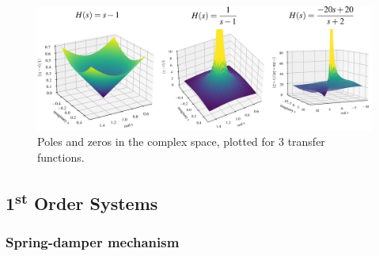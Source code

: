 \documentclass[12pt,letter]{article}
\begin{document}
			\begin{figure}[H]
				\centering
				\includegraphics[width=6.5in]{../figures/transfer_function_3D_space_3_examples.png}
				\caption{Poles and zeros in the complex space, plotted for 3 transfer functions.}
				\label{fig:transfer_function_3D_space_3_examples}
			\end{figure}





	\subsection{1\textsuperscript{st} Order Systems}	




	\subsubsection{Spring-damper mechanism}
\end{document}
